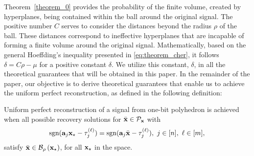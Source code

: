 \documentclass[12pt,draftcls,onecolumn]{IEEEtran}
\begin{document}
Theorem~\ref{theorem_0} provides the probability of the finite volume, created by hyperplanes, being contained within the ball around the original signal. The positive number
$C$ serves to consider the distances beyond the radius $\rho$ of the ball.
These distances correspond to ineffective hyperplanes that are incapable of forming a finite volume around the original signal. 
Mathematically, based on the general Hoeffding's inequality presented in \eqref{eq:theorem_cher}, it follows $\delta=C\rho-\mu$ for a positive constant $\delta$. We utilize this constant, $\delta$, in all the theoretical guarantees that will be obtained in this paper.
In the remainder of the paper, our objective is to derive theoretical guarantees that enable us to achieve the uniform perfect reconstruction, as defined in the following definition: 
\begin{definition}
Uniform perfect reconstruction of a signal from one-bit polyhedron is achieved when all possible recovery solutions for $\bar{\mathbf{x}}\in\mathcal{P}_{\mathbf{x}}$ with 
\begin{equation}
\label{kumjun}
\operatorname{sgn}(\mba_j\mbx_{\star}-\tau_{j}^{(\ell)})=\operatorname{sgn}(\mba_j\bar{\mbx}-\tau_{j}^{(\ell)}),~j\in[n],~\ell\in[m],
\end{equation}
satisfy $\bar{\mathbf{x}}\in\mathcal{B}_\rho\left(\mathbf{x}_{\star}\right)$, for all $\mathbf{x}_{\star}$ in the space.
\end{definition}
\end{document}
